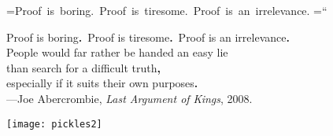 









\cleardoublepage
\thispagestyle{empty}

\vspace*{55pt}

\begin{centering}
	{
		{
		=\hbox{{Proof is boring. Proof is tiresome. Proof is an irrelevance.}}
		=\hbox{\Large``}
		\begin{minipage}{\wd0}
				{Proof is boring\color{P1797}\textbf{.}\normalcolor\ Proof is tiresome\color{P1797}\textbf{.}\normalcolor\ Proof is an irrelevance\color{P1797}\textbf{.}\normalcolor\\
				People would far rather be handed an easy lie\\
				than search for a difficult truth\color{P1797}\textbf{,}\normalcolor\\
				especially if it suits their own purposes\color{P1797}\textbf{.}\normalcolor}%
			\\
			\normalcolor\normalfont\normalsize\null \hfill---Joe Abercrombie, \emph{Last Argument of Kings}, 2008.
		\end{minipage}}
		\par}
\end{centering}


\cleardoublepage
\thispagestyle{empty}

\null\vfill
\noindent\texttt{[image: pickles2]}
\vfill

